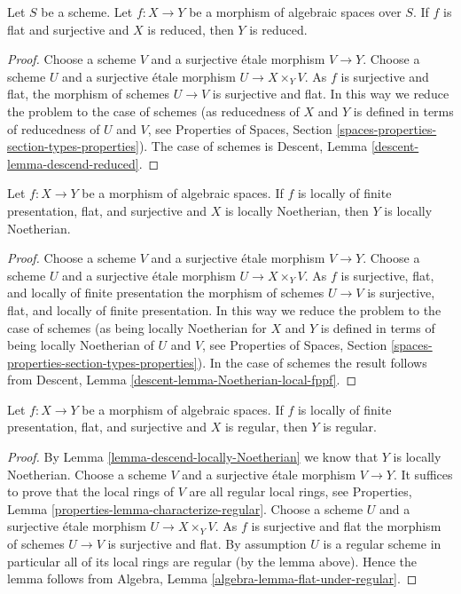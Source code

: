 \begin{lemma}
\label{lemma-descend-reduced}
Let $S$ be a scheme.
Let $f : X \to Y$ be a morphism of algebraic spaces over $S$.
If $f$ is flat and surjective and $X$ is reduced, then $Y$ is reduced.
\end{lemma}

\begin{proof}
Choose a scheme $V$ and a surjective \'etale morphism $V \to Y$.
Choose a scheme $U$ and a surjective \'etale morphism
$U \to X \times_Y V$. As $f$ is surjective and flat, the morphism of
schemes $U \to V$ is surjective and flat. In this way we reduce the
problem to the case of schemes (as reducedness of $X$ and $Y$ is defined
in terms of reducedness of $U$ and $V$, see
Properties of Spaces,
Section \ref{spaces-properties-section-types-properties}).
The case of schemes is
Descent, Lemma \ref{descent-lemma-descend-reduced}.
\end{proof}

\begin{lemma}
\label{lemma-descend-locally-Noetherian}
Let $f : X \to Y$ be a morphism of algebraic spaces.
If $f$ is locally of finite presentation, flat, and surjective and
$X$ is locally Noetherian, then $Y$ is locally Noetherian.
\end{lemma}

\begin{proof}
Choose a scheme $V$ and a surjective \'etale morphism $V \to Y$.
Choose a scheme $U$ and a surjective \'etale morphism
$U \to X \times_Y V$. As $f$ is surjective, flat, and locally of
finite presentation the morphism of schemes $U \to V$ is surjective, flat, and
locally of finite presentation. In this way we reduce the
problem to the case of schemes (as being locally Noetherian for $X$ and $Y$
is defined in terms of being locally Noetherian of $U$ and $V$, see
Properties of Spaces,
Section \ref{spaces-properties-section-types-properties}).
In the case of schemes the result follows from
Descent, Lemma \ref{descent-lemma-Noetherian-local-fppf}.
\end{proof}

\begin{lemma}
\label{lemma-descend-regular}
Let $f : X \to Y$ be a morphism of algebraic spaces.
If $f$ is locally of finite presentation, flat, and surjective and
$X$ is regular, then $Y$ is regular.
\end{lemma}

\begin{proof}
By
Lemma \ref{lemma-descend-locally-Noetherian}
we know that $Y$ is locally Noetherian.
Choose a scheme $V$ and a surjective \'etale morphism $V \to Y$.
It suffices to prove that the local rings of $V$ are all regular local
rings, see
Properties, Lemma \ref{properties-lemma-characterize-regular}.
Choose a scheme $U$ and a surjective \'etale morphism
$U \to X \times_Y V$. As $f$ is surjective and flat the morphism of schemes
$U \to V$ is surjective and flat. By assumption $U$ is a regular scheme
in particular all of its local rings are regular (by the lemma above).
Hence the lemma follows from
Algebra, Lemma \ref{algebra-lemma-flat-under-regular}.
\end{proof}



